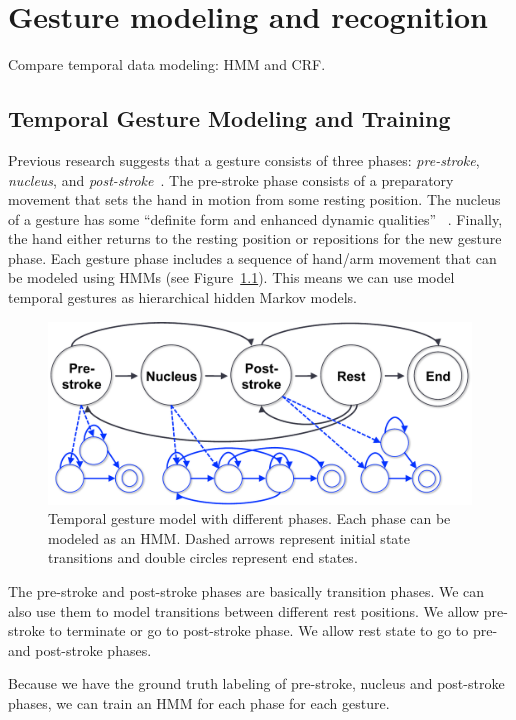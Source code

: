 \chapter{Gesture modeling and recognition}

Compare temporal data modeling: HMM and CRF. 

\section{Temporal Gesture Modeling and Training}

Previous research suggests that
a gesture consists of three phases: \textit{pre-stroke}, \textit{nucleus}, and \textit{post-stroke}~\cite{Pavlovic97}. The pre-stroke phase consists
of a preparatory movement that sets the hand in motion from some resting position.
The nucleus of a gesture has some ``definite form and enhanced dynamic qualities''
~\cite{kendon86}. Finally, the hand either returns to the resting position or repositions
for the new gesture phase. Each gesture
phase includes a sequence of hand/arm movement that can be modeled using HMMs (see Figure~\ref{fig:hmm}). 
This means we can use model temporal gestures as hierarchical hidden Markov
models.

\begin{figure}[h]
\centering
\includegraphics[clip, width=1\columnwidth]{figures/hmm.pdf}
\caption{Temporal gesture model with different phases. Each phase can be modeled as an HMM. Dashed arrows represent
initial state transitions and double circles
represent end states.}
\label{fig:hmm}
\end{figure}

The pre-stroke and post-stroke phases are basically transition phases. We
can also use them to model transitions between different rest positions. We
allow pre-stroke to terminate or go to post-stroke phase. We allow rest state to
go to pre- and post-stroke phases.

Because we have the ground truth labeling of pre-stroke, nucleus and post-stroke phases, 
we can train an HMM for each phase for each gesture. 

